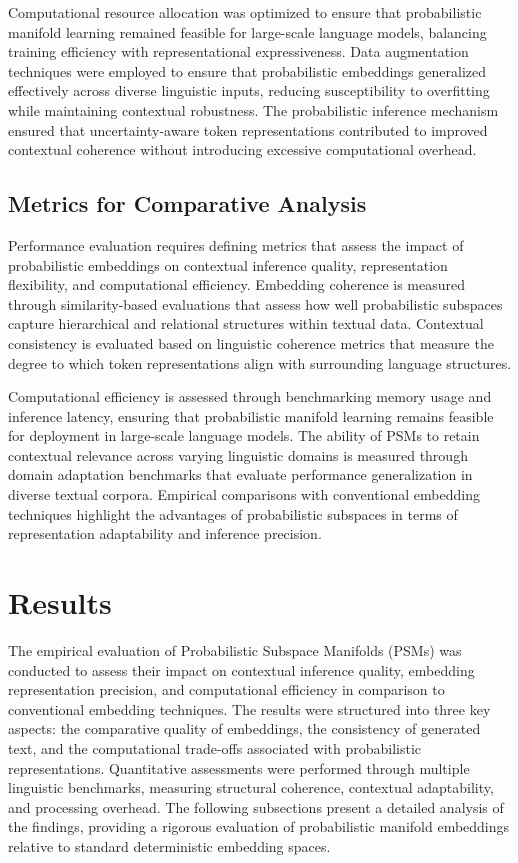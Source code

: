 \documentclass{article}
\begin{document}
Computational resource allocation was optimized to ensure that probabilistic manifold learning remained feasible for large-scale language models, balancing training efficiency with representational expressiveness. Data augmentation techniques were employed to ensure that probabilistic embeddings generalized effectively across diverse linguistic inputs, reducing susceptibility to overfitting while maintaining contextual robustness. The probabilistic inference mechanism ensured that uncertainty-aware token representations contributed to improved contextual coherence without introducing excessive computational overhead.


\subsection{Metrics for Comparative Analysis}

Performance evaluation requires defining metrics that assess the impact of probabilistic embeddings on contextual inference quality, representation flexibility, and computational efficiency. Embedding coherence is measured through similarity-based evaluations that assess how well probabilistic subspaces capture hierarchical and relational structures within textual data. Contextual consistency is evaluated based on linguistic coherence metrics that measure the degree to which token representations align with surrounding language structures.

Computational efficiency is assessed through benchmarking memory usage and inference latency, ensuring that probabilistic manifold learning remains feasible for deployment in large-scale language models. The ability of PSMs to retain contextual relevance across varying linguistic domains is measured through domain adaptation benchmarks that evaluate performance generalization in diverse textual corpora. Empirical comparisons with conventional embedding techniques highlight the advantages of probabilistic subspaces in terms of representation adaptability and inference precision.



\section{Results}

The empirical evaluation of Probabilistic Subspace Manifolds (PSMs) was conducted to assess their impact on contextual inference quality, embedding representation precision, and computational efficiency in comparison to conventional embedding techniques. The results were structured into three key aspects: the comparative quality of embeddings, the consistency of generated text, and the computational trade-offs associated with probabilistic representations. Quantitative assessments were performed through multiple linguistic benchmarks, measuring structural coherence, contextual adaptability, and processing overhead. The following subsections present a detailed analysis of the findings, providing a rigorous evaluation of probabilistic manifold embeddings relative to standard deterministic embedding spaces.
\end{document}
